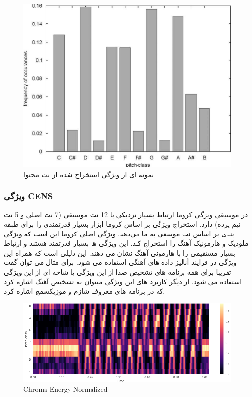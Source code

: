\documentclass[conference]{IEEEtran}
\begin{document}
\begin{figure}[h!]
\includegraphics[width=\linewidth]{8.jpg}
      \caption{ نمونه ای از ویژگی استخراج شده از نت محتوا }
      \label{fig:fig 1}
    \end{figure}


    \subsubsection{ ویژگی CENS      }
    در موسیقی ویژگی کروما ارتباط بسیار نزدیکی با 12 نت موسیقی (7 نت اصلی و 5 نت نیم پرده) دارد. استخراج ویژگی بر اساس کروما ابزار بسیار قدرتمندی را برای طبقه بندی بر اساس نت موسقی به ما می‌دهد. ویژگی اصلی کروما این است که ویژگی ملودیک و هارمونیک آهنگ را استخراج کند.
این ویژگی ها بسیار قدرتمند هستند و ارتباط بسیار مستقیمی را با هارمونی آهنگ نشان می دهند. این دلیلی است که همراه این ویژگی در فرایند آنالیز داده های آهنگی استفاده می شود. برای مثال می توان گفت تقریبا برای همه برنامه های تشخیص صدا از این ویژگی یا شاخه ای از این ویژگی استفاده می شود. از دیگر کاربرد های این ویژگی میتوان به تشخیص آهنگ اشاره کرد که در برنامه های معروف شازم       و موزیکسمچ     اشاره کرد.
\begin{figure}[h!]
\includegraphics[width=\linewidth]{1.png}
      \caption{ Chroma Energy Normalized }
      \label{fig:fig 1}
    \end{figure}
\end{document}
